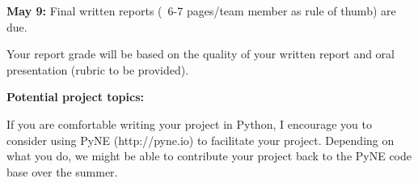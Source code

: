 \documentclass[12pt]{article}
\begin{document}
\vspace*{2 em}
\textbf{May 9:} Final written reports (~6-7 pages/team member as rule of thumb) are due.

\vspace*{2 em}
Your report grade will be based on the quality of your written report and oral presentation (rubric to be provided). 

\clearpage 
\begin{center}
\textbf{Potential project topics:}
\end{center}

If you are comfortable writing your project in Python, I encourage you to consider using PyNE (http://pyne.io) to facilitate your project. Depending on what you do, we might be able to contribute your project back to the PyNE code base over the summer.
\end{document}
